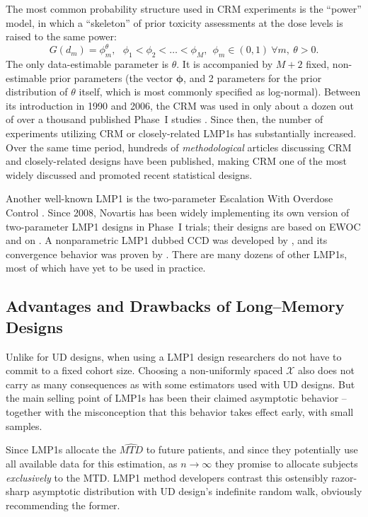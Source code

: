 The most common probability structure used in CRM experiments is the ``power'' model, in which a ``skeleton'' of prior toxicity assessments at the dose levels is raised to the same power:
\begin{equation}\label{eq:crm0}
G\left(d_m\right)=\phi_m^\theta,\ \ \ \phi_1<\phi_2<\ldots <\phi_M ,\ \ \phi_m\in(0,1) \ \forall m,\ \theta>0.
\end{equation}
The only data-estimable parameter is $\theta$. It is accompanied by $M+2$ fixed, non-estimable prior parameters (the vector $\boldsymbol{\phi}$, and 2 parameters for the prior distribution of $\theta$ itself, which is most commonly specified as log-normal). Between its introduction in 1990 and 2006, the CRM was used in only about a dozen out of over a thousand published Phase~I studies \citep{Rogat:etal:oped:2007}. Since then, the number of experiments utilizing CRM or closely-related LMP1s has substantially increased. Over the same time period, hundreds of \emph{methodological} articles discussing CRM and closely-related designs have been published, making CRM one of the most widely discussed and promoted recent statistical designs.

Another well-known LMP1 is the two-parameter Escalation With Overdose Control \citep[EWOC,][]{Babb:Roga:Roga:Zack:canc:1998}. Since 2008, Novartis has been widely implementing its own version of two-parameter LMP1 designs in Phase~I trials; their designs are based on EWOC and on \cite{Neunsch08}. A nonparametric LMP1 dubbed CCD was developed by \cite{Ivan:Flou:Chun:Cumu:2007}, and its convergence behavior was proven by \cite{oron:azri:hoff:dose:2011}. There are many dozens of other LMP1s, most of which have yet to be used in practice.

\subsection{Advantages and Drawbacks of Long--Memory Designs}

Unlike for UD designs, when using a LMP1 design researchers do not have to commit to a fixed cohort size. Choosing a non-uniformly spaced $\mathcal{X}$ also does not carry as many consequences as with some estimators used with UD designs. But the main selling point of LMP1s has been their claimed asymptotic behavior -- together with the misconception that this behavior takes effect early, with small samples.

Since LMP1s allocate the $\widehat{MTD}$ to future patients, and since they potentially use all available data for this estimation, as $n\to\infty$ they promise to allocate subjects \emph{exclusively} to the MTD. LMP1 method developers contrast this ostensibly razor-sharp asymptotic distribution with UD design's indefinite random walk, obviously recommending the former.

